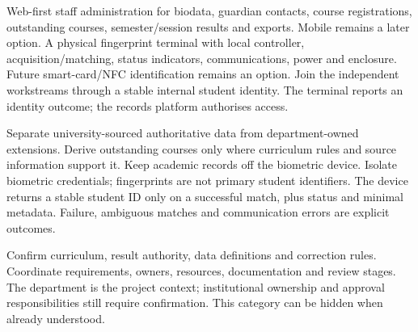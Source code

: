 
 {Web-first staff administration for biodata, guardian contacts, course registrations,
 outstanding courses, semester/session results and exports. Mobile remains a later option.}
 {A physical fingerprint terminal with local controller, acquisition/matching,
 status indicators, communications, power and enclosure. Future smart-card/NFC
 identification remains an option.}
 {Join the independent workstreams through a stable internal student identity.
 The terminal reports an identity outcome; the records platform authorises access.}

 {Separate university-sourced authoritative data from department-owned extensions.
 Derive outstanding courses only where curriculum rules and source information support it.}
 {Keep academic records off the biometric device. Isolate biometric credentials;
 fingerprints are not primary student identifiers.}
 {The device returns a stable student ID only on a successful match, plus status and
 minimal metadata. Failure, ambiguous matches and communication errors are explicit outcomes.}

 {Confirm curriculum, result authority, data definitions and correction rules.}
 {Coordinate requirements, owners, resources, documentation and review stages.}
 {The department is the project context; institutional ownership and approval responsibilities
 still require confirmation. This category can be hidden when already understood.}

